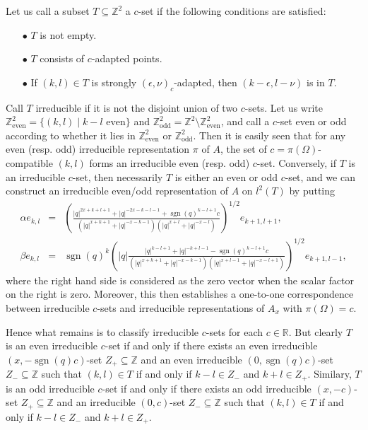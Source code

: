 \documentclass[12pt]{article}
\theoremstyle{change}
\DeclareMathOperator{\sgn}{\mathrm{sgn}}
\newcommand{\R}{\mathbb{R}}
\newcommand{\Z}{\mathbb{Z}}
\newcommand{\even}{\textrm{even}}
\newcommand{\odd}{\textrm{odd}}
\theoremstyle{definition}
\numberwithin{equation}{section}
\begin{document}
Let us call a subset $T\subseteq \Z^2$ a $c$-set if the following conditions are satisfied: 
\begin{itemize} 
\item[$\bullet$] $T$ is not empty.
\item[$\bullet$] $T$ consists of $c$-adapted points.
\item[$\bullet$] If $(k,l)\in T$ is strongly $(\epsilon,\nu)_c$-adapted, then $(k-\epsilon,l-\nu)$ is in $T$.
\end{itemize}

Call $T$ irreducible if it is not the disjoint union of two $c$-sets.  Let us write $\Z^2_{\even} = \{(k,l)\mid k-l \textrm{ even}\}$ and $\Z^2_{\odd} = \Z^2\setminus \Z^2_{\even}$, and call a $c$-set even or odd according to whether it lies in $\Z^2_{\even}$ or $\Z^2_{\odd}$. Then it is easily seen that for any even (resp. odd) irreducible representation $\pi$ of $A$, the set of $c=\pi(\Omega)$-compatible $(k,l)$ forms an irreducible even (resp. odd) $c$-set. Conversely, if $T$ is an irreducible $c$-set, then necessarily $T$ is either an even or odd $c$-set, and we can construct an irreducible even/odd representation of $A$ on $l^2(T)$ by putting \begin{eqnarray*} \alpha e_{k,l} &=&  \left(\frac{|q|^{2x+k+l+1}+|q|^{-2x-k-l-1}+\sgn(q)^{k-l+1}c}{(|q|^{x+k+1}+|q|^{-x-k-1})(|q|^{x+l}+|q|^{-x-l})}\right)^{1/2}e_{k+1,l+1},\\ \beta e_{k,l} &=& \sgn(q)^{k}\left(|q|\frac{|q|^{k-l+1}+|q|^{-k+l-1}-\sgn(q)^{k-l+1}c}{(|q|^{x+k+1}+|q|^{-x-k-1})(|q|^{x+l-1}+|q|^{-x-l+1})}\right)^{1/2} e_{k+1,l-1},\end{eqnarray*} where the right hand side is considered as the zero vector when the scalar factor on the right is zero. Moreover, this then establishes a one-to-one correspondence between irreducible $c$-sets and irreducible representations of $A_x$ with $\pi(\Omega) =c$.

Hence what remains is to classify irreducible $c$-sets for each $c\in \R$. But clearly $T$ is an even irreducible $c$-set if and only if there exists an even irreducible $(x,-\sgn(q)c)$-set $Z_+\subseteq \Z$ and an even irreducible $(0,\sgn(q)c)$-set $Z_-\subseteq \Z$ such that $(k,l)\in T$ if and only if $k-l\in Z_-$ and $k+l\in Z_+$. Similary, $T$ is an odd irreducible $c$-set if and only if there exists an odd irreducible $(x,-c)$-set $Z_+\subseteq \Z$ and an irreducible $(0,c)$-set $Z_-\subseteq \Z$ such that $(k,l)\in T$ if and only if $k-l\in Z_-$ and $k+l\in Z_+$.
\end{document}
